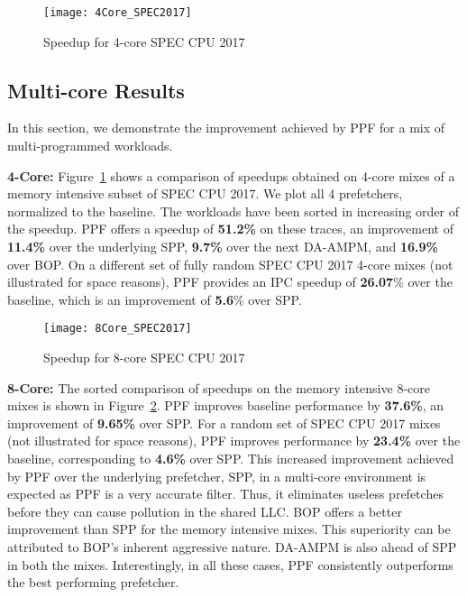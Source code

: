 
\begin{figure}[ht]
\texttt{[image: 4Core\_SPEC2017]}
\caption{Speedup for 4-core SPEC CPU 2017}
\label{Fig:4Core_SPEC2017}
\end{figure}

\subsection{Multi-core Results}
\label{Results-Multi}
In this section, we demonstrate the improvement achieved by PPF for a
mix of multi-programmed workloads.

\noindent \textbf{4-Core:} Figure~\ref{Fig:4Core_SPEC2017}
shows a comparison of speedups obtained on 4-core mixes of a memory
intensive subset of SPEC CPU 2017. We plot all 4 prefetchers, normalized
to the baseline. The workloads have been sorted in increasing order of
the speedup. PPF offers a speedup of \textbf{51.2\%} on these traces,
an improvement of \textbf{11.4\%} over the underlying SPP,
\textbf{9.7\%} over the next DA-AMPM, and \textbf{16.9\%} over BOP.
On a different set of fully random SPEC CPU 2017 4-core mixes (not
illustrated for space reasons), PPF provides an IPC speedup of
\textbf{26.07}\% over the
baseline, which is an improvement of \textbf{5.6}\% over SPP.

\begin{figure}[ht]
\texttt{[image: 8Core\_SPEC2017]}
\caption{Speedup for 8-core SPEC CPU 2017}
\label{Fig:8Core_SPEC2017}
\end{figure}

\noindent \textbf{8-Core:} The sorted comparison of speedups on the
memory intensive 8-core mixes is shown in
Figure~\ref{Fig:8Core_SPEC2017}.  PPF improves baseline performance by
\textbf{37.6\%}, an improvement of \textbf{9.65\%} over SPP. For a
random set of SPEC CPU 2017 mixes (not illustrated for space reasons),
PPF improves performance by \textbf{23.4\%} over the baseline,
corresponding to \textbf{4.6\%} over SPP. This increased improvement
achieved by PPF over the {\color{red}underlying prefetcher, SPP,} 
in a multi-core environment is expected as PPF is a very accurate filter. 
Thus, it eliminates useless prefetches before they can cause pollution in the 
shared LLC. BOP offers a better improvement than SPP for the memory intensive
mixes. This superiority can be attributed to BOP's inherent aggressive
nature. DA-AMPM is also ahead of SPP in both the mixes. Interestingly,
in all these cases, PPF consistently outperforms the best performing
prefetcher.

